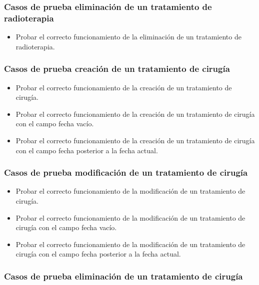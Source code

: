 \subsubsection{Casos de prueba eliminación de un tratamiento de radioterapia}

\begin{itemize}
    \item Probar el correcto funcionamiento de la eliminación de un tratamiento de radioterapia.
\end{itemize}

\subsubsection{Casos de prueba creación de un tratamiento de cirugía}

\begin{itemize}
    \item Probar el correcto funcionamiento de la creación de un tratamiento de cirugía.
    \item Probar el correcto funcionamiento de la creación de un tratamiento de cirugía con el campo fecha vacío.
    \item Probar el correcto funcionamiento de la creación de un tratamiento de cirugía con el campo fecha posterior a la fecha actual.
\end{itemize}

\subsubsection{Casos de prueba modificación de un tratamiento de cirugía}

\begin{itemize}
    \item Probar el correcto funcionamiento de la modificación de un tratamiento de cirugía.
    \item Probar el correcto funcionamiento de la modificación de un tratamiento de cirugía con el campo fecha vacío.
    \item Probar el correcto funcionamiento de la modificación de un tratamiento de cirugía con el campo fecha posterior a la fecha actual.
\end{itemize}

\subsubsection{Casos de prueba eliminación de un tratamiento de cirugía}

